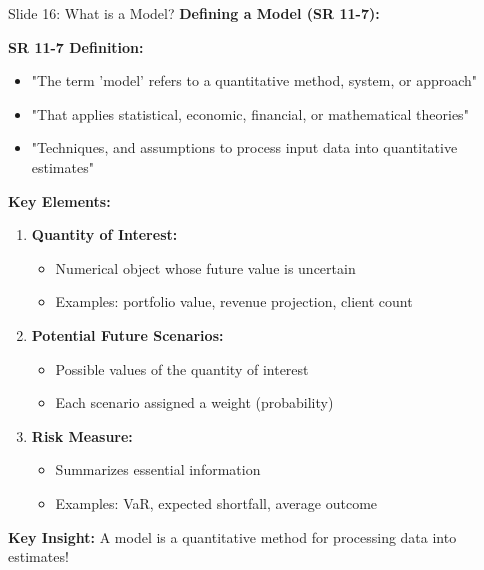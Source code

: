 \documentclass[8pt]{beamer}
\begin{document}
	
	\begin{frame}{Slide 16: What is a Model?}
		\fontsize{6.5}{7.5}\selectfont
		\textbf{Defining a Model (SR 11-7):}
		
		\vspace{0.1cm}
		\textbf{SR 11-7 Definition:}
		\begin{itemize}
			\item "The term 'model' refers to a quantitative method, system, or approach"
			\item "That applies statistical, economic, financial, or mathematical theories"
			\item "Techniques, and assumptions to process input data into quantitative estimates"
		\end{itemize}
		
		\vspace{0.1cm}
		\textbf{Key Elements:}
		\begin{enumerate}
			\item \textbf{Quantity of Interest:}
			\begin{itemize}
				\item Numerical object whose future value is uncertain
				\item Examples: portfolio value, revenue projection, client count
			\end{itemize}
			\item \textbf{Potential Future Scenarios:}
			\begin{itemize}
				\item Possible values of the quantity of interest
				\item Each scenario assigned a weight (probability)
			\end{itemize}
			\item \textbf{Risk Measure:}
			\begin{itemize}
				\item Summarizes essential information
				\item Examples: VaR, expected shortfall, average outcome
			\end{itemize}
		\end{enumerate}
		
		\textcolor{myblue}{\textbf{Key Insight:}} A model is a \textcolor{myblue}{quantitative method for processing data into estimates}!
	\end{frame}
	
\end{document}
